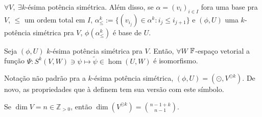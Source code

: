 \begin{theorem}
    \label{thm:1046}
    \(\forall V, \ \exists k\)-ésima potência simétrica. Além disso, se \(\alpha = (v_i)_{i\in I}\) fora uma base pra \(V\), \(\leq\) um ordem total em \(I\), \(\alpha^k_\leq:= \{(v_{i_j}) \in \alpha^k: i_j \leq i_{j+1}\}\) e \((\phi,U)\) uma $k$-potência simétrica pra \(V\), \(\phi(\alpha^k_\leq)\) é base de \(U\).   
\end{theorem}

\begin{theorem}
    \label{thm:1047}
    Seja \((\phi, U)\) $k$-ésima potência simétrica pra \(V\). Então, \(\forall W\) \(\mathbb{F}\)-espaço vetorial a função \(\Psi: S^k(V,W) \ni \psi \mapsto \widetilde{\psi} \in \hom(U,W)\) é isomorfismo. 
\end{theorem}

\begin{note}
    Notação não padrão pra a $k$-ésima potência simétrica, \((\phi, U) = (\odot ,  V^{\odot k})\). De novo, as propriedades que à definem tem sua versão com este símbolo.  
\end{note}

\begin{corollary}
    Se \(\dim V = n \in \mathbb{Z}_{>0}\), então \(\dim (V^{\odot k }) = \binom{n-1+k}{n-1}\). %
\end{corollary}

